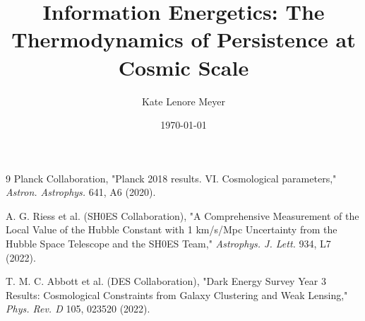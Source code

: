 \documentclass[aps,prd,twocolumn,showpacs,superscriptaddress,groupedaddress,nofootinbib,english,floatfix]{revtex4-2}
\begin{document}
\title{Information Energetics: The Thermodynamics of Persistence at Cosmic Scale}


\author{Kate Lenore Meyer}

\date{\today}



\maketitle %











%



\begin{thebibliography}{9}
    Planck Collaboration, "Planck 2018 results. VI. Cosmological parameters," \textit{Astron. Astrophys.} 641, A6 (2020).
    
    A. G. Riess et al. (SH0ES Collaboration), "A Comprehensive Measurement of the Local Value of the Hubble Constant with 1 km/s/Mpc Uncertainty from the Hubble Space Telescope and the SH0ES Team," \textit{Astrophys. J. Lett.} 934, L7 (2022).
    
    T. M. C. Abbott et al. (DES Collaboration), "Dark Energy Survey Year 3 Results: Cosmological Constraints from Galaxy Clustering and Weak Lensing," \textit{Phys. Rev. D} 105, 023520 (2022).
\end{thebibliography}
\end{document}
